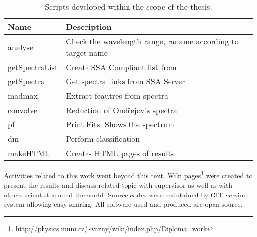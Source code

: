 \begin{table}[ht]
  \centering
  \small
     \begin{tabular}[ht]{l l}
     \toprule
     Name & Description \\
     \midrule
     analyse & Check the wavelength range, raname according to
     target name\\
     getSpectraList & Create SSA Compliant list from\\
     getSpectra & Get spectra links from SSA Server\\
     madmax & Extract feautres from spectra \\
     convolve &  Reduction of Ondřejov's spectra\\
     pf & Print Fits. Shows the spectrum \\
     dm &  Perform classification\\
     makeHTML & Creates HTML pages of results \\ 
     \bottomrule
   \end{tabular}
  \caption{Scripts developed within the scope of the thesis.}
  \label{tab:scripts}
\end{table}


Activities related to this work went beyond this text. Wiki
pages\footnote{\url{http://physics.muni.cz/~vazny/wiki/index.php/Diploma_work}}
were created to present the results and discuss related topic with
supervisor as well as with others scientist around the world. Source
codes were maintained by GIT version system allowing easy sharing. All
software used and produced are open source.








